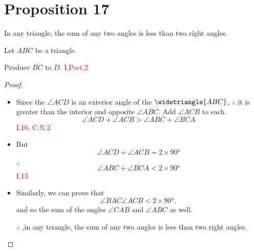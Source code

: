 
\section*{Proposition 17}
 
 \begin{thm}
In any triangle, the sum of any two angles is less than two right angles.
\end{thm}

Let $ABC$ be a triangle.

\begin{figure}[H]
\end{figure}

Produce $\overline{BC}$ to $D$. \hfill\textcolor{red}{I.Post.2}

\begin{figure}[H]
 	\caption{}
\end{figure} 

\begin{proof}

\begin{itemize}

\item[]

\item Since the $\angle{ACD}$ is an exterior angle of the $\widetriangle{ABC}$, $\therefore$ it is greater than the interior and opposite $\angle{ABC}$. Add $\angle{ACB}$ to each. 
\[ \angle{ACD} + \angle{ACB} > \angle{ABC} + \angle{BCA}\] \hfill\textcolor{red}{ I.16, C.N.2}

\clearpage

\item But 
\[\angle{ACD} + \angle{ACB} = 2\times\ang{90}\]

\item[$\therefore$] 
\[\angle{ABC} +\angle{BCA} <2\times\ang{90}\]\hfill\textcolor{red}{I.13}

\item Similarly, we can prove that 
\[\angle{BAC}  \angle{ACB} <2\times\ang{90},\] 
and so the sum of the angles $\angle{CAB}$ and $\angle{ABC}$ as well.

\item[$\therefore$],in any triangle, the sum of any two angles is less than two right angles.

\end{itemize}

\end{proof}

\clearpage 
